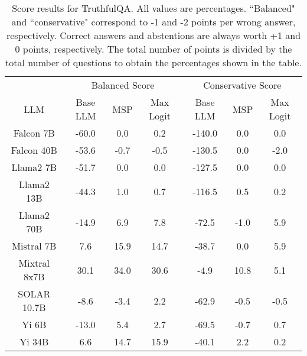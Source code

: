 \begin{table*}
\centering
\begin{tabular}{c|c|c|c|c|c|c}
& \multicolumn{3}{c|}{Balanced Score} & \multicolumn{3}{c}{Conservative Score} \\ 
LLM & Base LLM & MSP & Max Logit & Base LLM & MSP & Max Logit\\ \hline
Falcon 7B & -60.0 & 0.0 & 0.2 & -140.0 & 0.0 & 0.0\\
Falcon 40B & -53.6 & -0.7 & -0.5 & -130.5 & 0.0 & -2.0\\
Llama2 7B & -51.7 & 0.0 & 0.0 & -127.5 & 0.0 & 0.0\\
Llama2 13B & -44.3 & 1.0 & 0.7 & -116.5 & 0.5 & 0.2\\
Llama2 70B & -14.9 & 6.9 & 7.8 & -72.5 & -1.0 & 5.9\\
Mistral 7B & 7.6 & 15.9 & 14.7 & -38.7 & 0.0 & 5.9\\
Mixtral 8x7B & 30.1 & 34.0 & 30.6 & -4.9 & 10.8 & 5.1\\
SOLAR 10.7B & -8.6 & -3.4 & 2.2 & -62.9 & -0.5 & -0.5\\
Yi 6B & -13.0 & 5.4 & 2.7 & -69.5 & -0.7 & 0.7\\
Yi 34B & 6.6 & 14.7 & 15.9 & -40.1 & 2.2 & 0.2\\
\hline
\end{tabular}
\caption{Score results for TruthfulQA. All values are percentages. ``Balanced" and ``conservative" correspond to -1 and -2 points per wrong answer, respectively. Correct answers and abstentions are always worth +1 and 0 points, respectively. The total number of points is divided by the total number of questions to obtain the percentages shown in the table.}
\label{tab:truthfulqa_score}
\end{table*}
